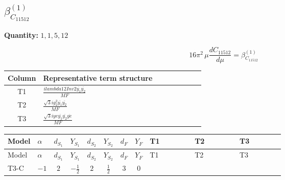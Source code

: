 \documentclass[8pt]{article}
\begin{document}
\begin{landscape}
\section*{$\beta_{C_{11512}}^{(1)}$}
\noindent\textbf{Quantity: }$\mathrm{1,1,5,12}$\par\smallskip
\[16\pi^2\,\mu\frac{d C_{11512}}{d\mu}=\beta_{C_{11512}}^{(1)}\]
\begin{center}
\begin{tabular}{@{}c >{\raggedright\arraybackslash}p{0.82\linewidth}@{}}
\toprule
Column & Representative term structure \\
\midrule
T1 & \(\displaystyle \frac{i lambda12Inv2 \overline{y_{1}} \overline{y_{2}}}{MF}\) \\
\midrule
T2 & \(\displaystyle \frac{\sqrt{3} i g_{2}^{2} \overline{y_{1}} \overline{y_{2}}}{MF}\) \\
\midrule
T3 & \(\displaystyle \frac{\sqrt{3} i ye \overline{y_{1}} \overline{y_{2}} \overline{ye}}{MF}\) \\
\midrule
\bottomrule
\end{tabular}
\end{center}
\smallskip
\tiny
\begin{longtable}{@{}llcccccc >{\raggedright\arraybackslash}p{0.21\linewidth} >{\raggedright\arraybackslash}p{0.21\linewidth} >{\raggedright\arraybackslash}p{0.21\linewidth}@{}}
\toprule
Model & $\alpha$ & $d_{S_1}$ & $Y_{S_1}$ & $d_{S_2}$ & $Y_{S_2}$ & $d_F$ & $Y_F$ & T1 & T2 & T3 \\
\midrule
\endfirsthead
\toprule
Model & $\alpha$ & $d_{S_1}$ & $Y_{S_1}$ & $d_{S_2}$ & $Y_{S_2}$ & $d_F$ & $Y_F$ & T1 & T2 & T3 \\
\midrule
\endhead
T3-C & $-1$ & $2$ & $-\frac{1}{2}$ & $2$ & $\frac{1}{2}$ & $3$ & $0$ & \scriptsize\adjustbox{max width=\linewidth}{$\begin{gathered} \frac{i lambda12Inv2 \overline{y_{1}} \overline{y_{2}}}{3 MF}\end{gathered}$} & \scriptsize\adjustbox{max width=\linewidth}{$\begin{gathered} \frac{\sqrt{3} i g_{2}^{2} \overline{y_{1}} \overline{y_{2}}}{4 MF}\end{gathered}$} & \scriptsize\adjustbox{max width=\linewidth}{$\begin{gathered} - \frac{\sqrt{3} i ye \overline{y_{1}} \overline{y_{2}} \overline{ye}}{12 MF}\end{gathered}$} \\
\midrule
\bottomrule
\end{longtable}
\clearpage

\end{landscape}
\end{document}
